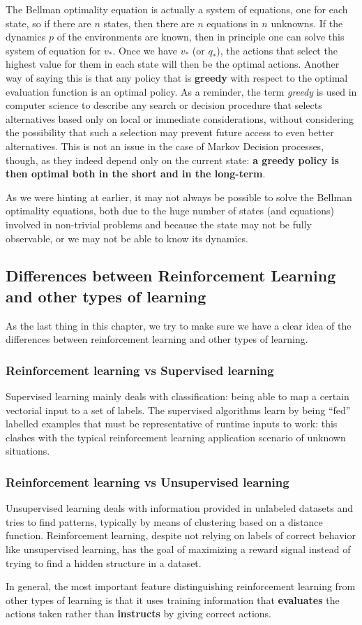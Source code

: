 The Bellman optimality equation is actually a system of equations, one for each state, so if there are $n$ states, then there are $n$ equations in $n$ unknowns. If the dynamics $p$ of the environments are known, then in principle one can solve this system of equation for $v_*$. Once we have $v_*$ (or $q_*$), the actions that select the highest value for them in each state will then be the optimal actions. Another way of saying this is that any policy that is \textbf{greedy} with respect to the optimal evaluation function is an optimal policy. As a reminder, the term \textit{greedy} is used in computer science to describe any search or decision procedure that selects alternatives based only on local or immediate considerations, without considering the possibility that such a selection may prevent future access to even better alternatives. This is not an issue in the case of Markov Decision processes, though, as they indeed depend only on the current state: \textbf{a greedy policy is then optimal both in the short and in the long-term}.

As we were hinting at earlier, it may not always be possible to solve the Bellman optimality equations, both due to the huge number of states (and equations) involved in non-trivial problems and because the state may not be fully observable, or we may not be able to know its dynamics.

\subsection{Differences between Reinforcement Learning and other types of learning}
As the last thing in this chapter, we try to make sure we have a clear idea of the differences between reinforcement learning and other types of learning.

\subsubsection{Reinforcement learning vs Supervised learning}
Supervised learning mainly deals with classification: being able to map a certain vectorial input to a set of labels. The supervised algorithms learn by being ``fed'' labelled examples that must be representative of runtime inputs to work: this clashes with the typical reinforcement learning application scenario of unknown situations.

\subsubsection{Reinforcement learning vs Unsupervised learning}
Unsupervised learning deals with information provided in unlabeled datasets and tries to find patterns, typically by means of clustering based on a distance function. Reinforcement learning, despite not relying on labels of correct behavior like unsupervised learning, has the goal of maximizing a reward signal instead of trying to find a hidden structure in a dataset.

In general, the most important feature distinguishing reinforcement learning from other types of learning is that it uses training information that \textbf{evaluates} the actions taken rather than \textbf{instructs} by giving correct actions.